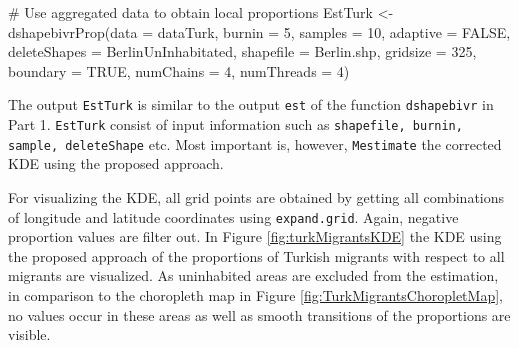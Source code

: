 \begin{example}
    # Use aggregated data to obtain local proportions
    EstTurk <- dshapebivrProp(data = dataTurk, burnin = 5, samples = 10,
                              adaptive = FALSE, deleteShapes = BerlinUnInhabitated,
                              shapefile = Berlin.shp, gridsize = 325, boundary = TRUE,
                              numChains = 4, numThreads = 4)
\end{example}

The output \texttt{EstTurk} is similar to the output \texttt{est} of the function \texttt{dshapebivr} in Part 1. \texttt{EstTurk} consist of input information such as \texttt{shapefile, burnin, sample, deleteShape} etc. Most important is, however, \texttt{Mestimate} the corrected KDE using the proposed approach. 

For visualizing the KDE, all grid points are obtained by getting all combinations of longitude and latitude coordinates using \texttt{expand.grid}. Again, negative proportion values are filter out.
In Figure \ref{fig:turkMigrantsKDE} the KDE using the proposed approach of the proportions of Turkish migrants with respect to all migrants are visualized. As uninhabited areas are excluded from the estimation, in comparison to the choropleth map in Figure \ref{fig:TurkMigrantsChoropletMap}, no values occur in these areas as well as smooth transitions of the proportions are visible. 



